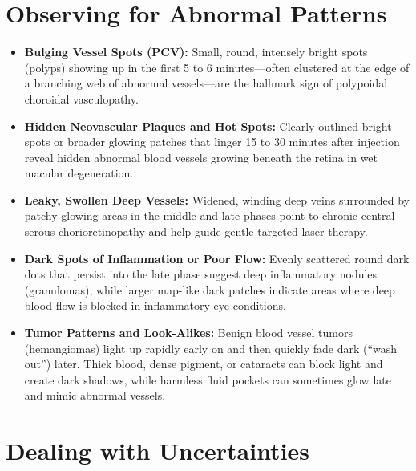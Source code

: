\section{Observing for Abnormal Patterns}

\begin{itemize}
    \item \textbf{Bulging Vessel Spots (PCV):} Small, round, intensely bright spots (polyps) showing up in the first 5 to 6 minutes---often clustered at the edge of a branching web of abnormal vessels---are the hallmark sign of polypoidal choroidal vasculopathy.
    \item \textbf{Hidden Neovascular Plaques and Hot Spots:} Clearly outlined bright spots or broader glowing patches that linger 15 to 30 minutes after injection reveal hidden abnormal blood vessels growing beneath the retina in wet macular degeneration.
    \item \textbf{Leaky, Swollen Deep Vessels:} Widened, winding deep veins surrounded by patchy glowing areas in the middle and late phases point to chronic central serous chorioretinopathy and help guide gentle targeted laser therapy.
    \item \textbf{Dark Spots of Inflammation or Poor Flow:} Evenly scattered round dark dots that persist into the late phase suggest deep inflammatory nodules (granulomas), while larger map-like dark patches indicate areas where deep blood flow is blocked in inflammatory eye conditions.
    \item \textbf{Tumor Patterns and Look-Alikes:} Benign blood vessel tumors (hemangiomas) light up rapidly early on and then quickly fade dark (``wash out'') later. Thick blood, dense pigment, or cataracts can block light and create dark shadows, while harmless fluid pockets can sometimes glow late and mimic abnormal vessels.
\end{itemize}

\section{Dealing with Uncertainties}

